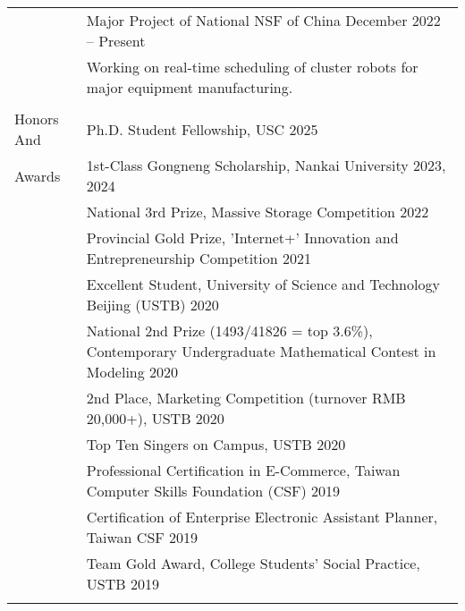 \documentclass[letterpaper, 10pt]{article}
\begin{document}
\begin{longtable}{p{}p{}}
& {Major Project of National NSF of China} \hfill December 2022 -- Present \\
& Working on real-time scheduling of cluster robots for major equipment manufacturing. \\
& \\



%
%



\nohyphens{\textcolor{OliveGreen}{Honors And}}
& Ph.D. Student Fellowship, USC \hfill 2025 \\
\nohyphens{\textcolor{OliveGreen}{Awards}}
& 1st-Class Gongneng Scholarship, Nankai University \hfill 2023, 2024 \\
& National 3rd Prize, Massive Storage Competition \hfill 2022 \\
& Provincial Gold Prize, 'Internet+' Innovation and Entrepreneurship Competition \hfill 2021 \\
& Excellent Student, University of Science and Technology Beijing (USTB) \hfill 2020 \\
& National 2nd Prize (1493/41826 = top 3.6\%), Contemporary Undergraduate Mathematical Contest in Modeling \hfill 2020 \\
& 2nd Place, Marketing Competition (turnover RMB 20,000+), USTB \hfill 2020 \\
& Top Ten Singers on Campus, USTB \hfill 2020 \\
& Professional Certification in E-Commerce, Taiwan Computer Skills Foundation (CSF) \hfill 2019 \\
& Certification of Enterprise Electronic Assistant Planner, Taiwan CSF \hfill 2019 \\	
& Team Gold Award, College Students' Social Practice, USTB \hfill 2019 \\
& \\
 


\end{longtable}
\end{document}
